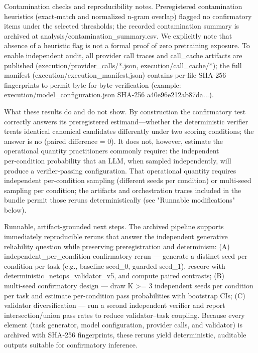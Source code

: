 \documentclass[conference]{IEEEtran}
\begin{document}
Contamination checks and reproducibility notes. Preregistered contamination heuristics (exact‑match and normalized n‑gram overlap) flagged no confirmatory items under the selected thresholds; the recorded contamination summary is archived at analysis/contamination\_summary.csv. We explicitly note that absence of a heuristic flag is not a formal proof of zero pretraining exposure. To enable independent audit, all provider call traces and call\_cache artifacts are published (execution/provider\_calls/*.json, execution/call\_cache/*); the full manifest (execution/execution\_manifest.json) contains per‑file SHA‑256 fingerprints to permit byte‑for‑byte verification (example: execution/model\_configuration.json SHA‑256 a40e96e212ab87da...).

What these results do and do not show. By construction the confirmatory test correctly answers its preregistered estimand---whether the deterministic verifier treats identical canonical candidates differently under two scoring conditions; the answer is no (paired difference = 0). It does not, however, estimate the operational quantity practitioners commonly require: the independent per‑condition probability that an LLM, when sampled independently, will produce a verifier‑passing configuration. That operational quantity requires independent per‑condition sampling (different seeds per condition) or multi‑seed sampling per condition; the artifacts and orchestration traces included in the bundle permit those reruns deterministically (see "Runnable modifications" below).

Runnable, artifact‑grounded next steps. The archived pipeline supports immediately reproducible reruns that answer the independent generative reliability question while preserving preregistration and determinism: (A) independent\_per\_condition confirmatory rerun --- generate a distinct seed per condition per task (e.g., baseline seed\_0, guarded seed\_1), rescore with deterministic\_netops\_validator\_v5, and compute paired contrasts; (B) multi‑seed confirmatory design --- draw K >= 3 independent seeds per condition per task and estimate per‑condition pass probabilities with bootstrap CIs; (C) validator diversification --- run a second independent verifier and report intersection/union pass rates to reduce validator--task coupling. Because every element (task generator, model configuration, provider calls, and validator) is archived with SHA‑256 fingerprints, these reruns yield deterministic, auditable outputs suitable for confirmatory inference.
\end{document}
